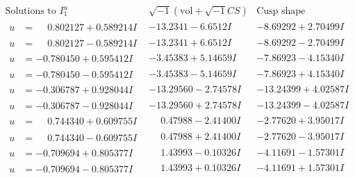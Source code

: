 \documentclass[1p]{elsarticle_modified}
\theoremstyle{definition}
\newcommand{\I}{\sqrt{-1}}
\begin{document}
$$\begin{array}{c|c|c}  
\text{Solutions to }I^u_{1}& \I (\text{vol} + \sqrt{-1}CS) & \text{Cusp shape}\\
 \hline 
\begin{aligned}
u &= \phantom{-}0.802127 + 0.589214 I\end{aligned}
 & -13.2341 - 6.6512 I & -8.69292 + 2.70499 I \\ \hline\begin{aligned}
u &= \phantom{-}0.802127 - 0.589214 I\end{aligned}
 & -13.2341 + 6.6512 I & -8.69292 - 2.70499 I \\ \hline\begin{aligned}
u &= -0.780450 + 0.595412 I\end{aligned}
 & -3.45383 + 5.14659 I & -7.86923 - 4.15340 I \\ \hline\begin{aligned}
u &= -0.780450 - 0.595412 I\end{aligned}
 & -3.45383 - 5.14659 I & -7.86923 + 4.15340 I \\ \hline\begin{aligned}
u &= -0.306787 + 0.928044 I\end{aligned}
 & -13.29560 - 2.74578 I & -13.24399 + 4.02587 I \\ \hline\begin{aligned}
u &= -0.306787 - 0.928044 I\end{aligned}
 & -13.29560 + 2.74578 I & -13.24399 - 4.02587 I \\ \hline\begin{aligned}
u &= \phantom{-}0.744340 + 0.609755 I\end{aligned}
 & \phantom{-}0.47988 - 2.41400 I & -2.77620 + 3.95017 I \\ \hline\begin{aligned}
u &= \phantom{-}0.744340 - 0.609755 I\end{aligned}
 & \phantom{-}0.47988 + 2.41400 I & -2.77620 - 3.95017 I \\ \hline\begin{aligned}
u &= -0.709694 + 0.805377 I\end{aligned}
 & \phantom{-}1.43993 - 0.10326 I & -4.11691 - 1.57301 I \\ \hline\begin{aligned}
u &= -0.709694 - 0.805377 I\end{aligned}
 & \phantom{-}1.43993 + 0.10326 I & -4.11691 + 1.57301 I \\ \hline\begin{aligned}

\end{aligned}
\end{array}$$
\end{document}
